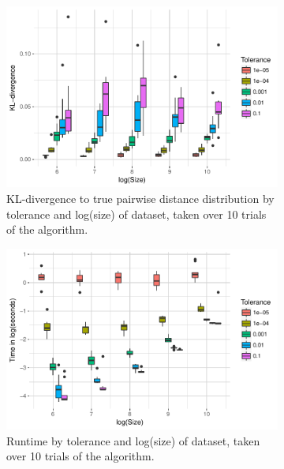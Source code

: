 \documentclass{article}
\begin{document}
\begin{figure}
    \begin{subfigure}[t]{0.49\textwidth}
        \includegraphics[width=\linewidth]{Figures/PairwiseDistance/div_by_size_and_tol.pdf}
        \caption{KL-divergence to true pairwise distance distribution by tolerance and log(size) of dataset, taken over 10 trials of the algorithm.}
        \label{fig:PDDivBySize}
    \end{subfigure}
    \begin{subfigure}[t]{0.49\textwidth}
        \includegraphics[width=\linewidth]{Figures/PairwiseDistance/time_by_size_and_tol.pdf}
        \caption{Runtime by tolerance and log(size) of dataset, taken over 10 trials of the algorithm.}
        \label{fig:PDTimeBySize}
    \end{subfigure}
    \begin{subfigure}{0.49\textwidth}

\end{subfigure}
\end{figure}
\end{document}
